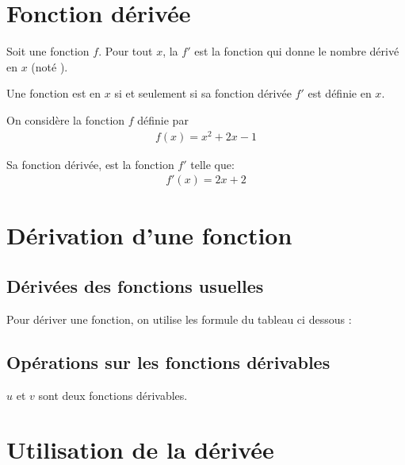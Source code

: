 \documentclass[12pt,a4paper]{article}
\newcommand{\disp}{true}
\begin{document}
	\section{Fonction dérivée}
	
	\begin{mydef}
		Soit une fonction $f$. Pour tout $x$, la  $f'$ est la fonction qui donne le nombre dérivé en $x$ (noté ). 
		
		Une fonction est  en $x$ si et seulement si sa fonction dérivée $f'$ est définie en $x$.
	\end{mydef}
	
	\begin{myex}
		On considère la fonction $f$ définie par 
		\begin{align*}
		f(x) = x^2+2x-1
		\end{align*}
		
		Sa fonction dérivée, est la fonction $f'$ telle que:
		\begin{align*}
			f'(x) = 2x+2
		\end{align*}
	\end{myex}
	
	\newpage 
	
\section{Dérivation d'une fonction}
	
	\subsection{Dérivées des fonctions usuelles}
	
	Pour dériver une fonction, on utilise les formule du tableau ci dessous :
	
	\begin{center}
		\drv{\disp}
	\end{center}

	\subsection{Opérations sur les fonctions dérivables}
	
	$u$ et $v$ sont deux fonctions dérivables.
	
	\begin{center}
		\drvOp{\disp}
	\end{center}

\section{Utilisation de la dérivée}
	
\end{document}
